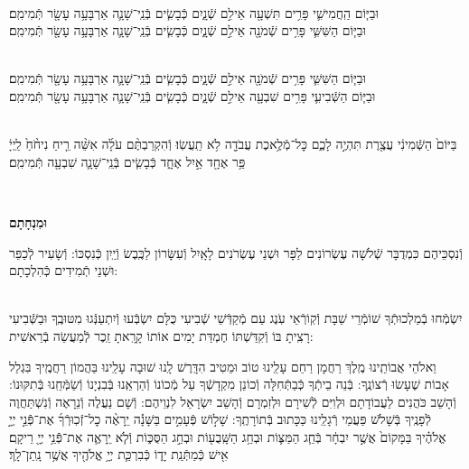 \documentclass[twoside, openany, parskip=half, 11pt]{book}
\begin{document}
 \\
וּבַיּ֧וֹם הַֽחֲמִישִׁ֛י פָּרִ֥ים תִּשְׁעָ֖ה אֵילִ֣ם שְֿׁנָ֑יִם כְּֿבָשִׂ֧ים בְּֿנֵֽי־שָׁנָ֛ה אַרְבָּעָ֥ה עָשָׂ֖ר תְּֿמִימִֽם׃
\\
וּבַיּ֧וֹם הַשִּׁשִּׁ֛י פָּרִ֥ים שְֿׁמֹנָ֖ה אֵילִ֣ם שְֿׁנָ֑יִם כְּֿבָשִׂ֧ים בְּֿנֵֽי־שָׁנָ֛ה אַרְבָּעָ֥ה עָשָׂ֖ר תְּֿמִימִֽם׃



 \\
וּבַיּ֧וֹם הַשִּׁשִּׁ֛י פָּרִ֥ים שְֿׁמֹנָ֖ה אֵילִ֣ם שְֿׁנָ֑יִם כְּֿבָשִׂ֧ים בְּֿנֵֽי־שָׁנָ֛ה אַרְבָּעָ֥ה עָשָׂ֖ר תְּֿמִימִֽם׃
\\
וּבַיּ֧וֹם הַשְּֿׁבִיעִ֛י פָּרִ֥ים שִׁבְעָ֖ה אֵילִ֣ם שְֿׁנָ֑יִם כְּֿבָשִׂ֧ים בְּֿנֵֽי־שָׁנָ֛ה אַרְבָּעָ֥ה עָשָׂ֖ר תְּֿמִימִֽם׃



\\
בַּיּוֹם֙ הַשְּֿׁמִינִ֔י עֲצֶ֖רֶת תִּהְיֶ֣ה לָכֶ֑ם כׇּל־מְֿלֶ֥אכֶת עֲבֹדָ֖ה לֹ֥א תַֽעֲשֽׂוּ׃ וְֿהִקְרַבְתֶּ֨ם עֹלָ֜ה אִשֵּׁ֨ה רֵ֤יחַ נִיחֹ֨חַ֙ לַֽיְיָ֔ פַּ֥ר אֶחָ֖ד אַ֣יִל אֶחָ֑ד כְּֿבָשִׂ֧ים בְּֿנֵֽי־שָׁנָ֛ה שִׁבְעָ֖ה תְּֿמִימִֽם׃

\\ \label{uminchasam}
\begin{Large}\textbf{וּמִנְחָתָם}\end{Large}
וְֿנִסְכֵּיהֶם כִּמְדֻבָּר שְֿׁלֹשָׁה עֶשְׂרוֹנִים לַפָּר וּשְׁנֵי עֶשְׂרֹנִים לָאָֽיִל וְֿעִשָּׂרוֹן לַכֶּֽבֶשׂ וְֿיַֽיִן כְּֿנִסְכּוֹ: וְֿשָׂעִיר לְֿכַפֵּר וּשְׁנֵי תְֿמִידִים כְּֿהִלְכָתָם:

\begin{sometimes}
	
	\shabbos\\
	יִשְׂמְֿחוּ בְֿמַלְכוּתְֿךָ שׁוֹמְֿרֵי שַׁבָּת וְֿקֽוֹרְֿאֵי עֹֽנֶג עַם מְֿקַדְּֿשֵׁי שְֿׁבִיעִי כֻּלָּם יִשְׂבְּֿעוּ וְֿיִתְעַנְּֿגוּ מִטּוּבֶֽךָ וּבַשְּֿׁבִיעִי רָצִֽיתָ בּוֹ וְֿקִדַּשְׁתּוֹ חֶמְדַּת יָמִים אוֹתוֹ קָרָֽאתָ זֵֽכֶר לְֿמַעֲשֵׂה בְֿרֵאשִׁית:
	
\end{sometimes}

\enlargethispage{\baselineskip}
וֵאלֹהֵי אֲבוֹתֵֽינוּ מֶֽלֶךְ רַחֲמָן רַחֵם עָלֵֽינוּ טוֹב וּמֵטִיב הִדָּֽרֶשׁ לָֽנוּ שׁוּבָה עָלֵֽינוּ בַּהֲמוֹן רַחֲמֶֽיךָ בִּגְלַל אָבוֹת שֶׁעָשׂוּ רְֿצוֹנֶֽךָ: בְּֿנֵה בֵיתְֿךָ כְּֿבַתְּֿחִלָּה וְֿכוֹנֵן מִקְדָשְֿׁךָ עַל מְֿכוֹנוֹ וְֿהַרְאֵֽנוּ בְּֿבִנְיָנוֹ וְֿשַׂמְּֿחֵֽנוּ בְּֿתִקּוּנוֹ: וְֿהָשֵׁב כֹּהֲנִים לַעֲבוֹדָתָם וּלְוִיִּם לְֿשִׁירָם וּלְזִמְרָם וְֿהָשֵׁב יִשְׂרָאֵל לִנְוֵיהֶם: וְֿשָׁם נַעֲלֶה וְֿנֵרָאֶה וְֿנִשְׁתַּחֲוֶה לְֿפָנֶֽיךָ בְּֿשָׁלֹֹשׁ פַּעֲמֵי רְֿגָלֵֽינוּ כַּכָּתוּב בְּֿתוֹרָתֶֽךָ: שָׁל֣וֹשׁ פְּֿעָמִ֣ים בַּשָּׁנָ֡ה יֵֽרָאֶ֨ה כׇל־זְֿכֽוּרְֿךָ֜ אֶת־פְּֿֿנֵ֣י יְיָ֣ אֱלֹהֶ֗יךָ בַּמָּקוֹם֙ אֲשֶׁ֣ר יִבְחָ֔ר בְּֿחַ֧ג הַמַּצּ֛וֹת וּבְחַ֥ג הַשָּֽׁבֻע֖וֹת וּבְחַ֣ג הַסֻּכּ֑וֹת וְֿלֹ֧א יֵֽרָאֶ֛ה אֶת־פְּֿֿנֵ֥י יְיָ֖ רֵיקָֽם׃ אִ֖ישׁ כְּֿמַתְּֿנַֽת יָד֑וֹ כְּֿבִרְכַּ֛ת יְיָ֥ אֱלֹהֶ֖יךָ אֲשֶׁ֥ר נָֽתַן־לָֽךְ׃
\end{document}
